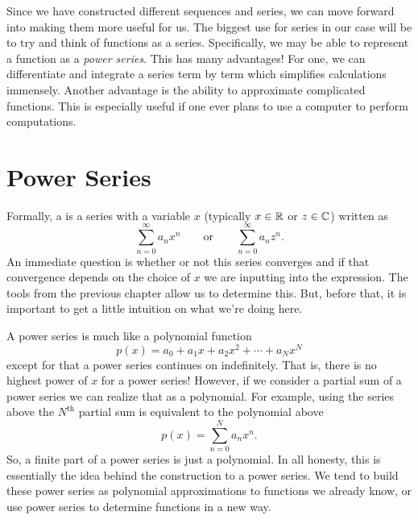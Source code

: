 Since we have constructed different sequences and series, we can move forward into making them more useful for us.  The biggest use for series in our case will be to try and think of functions as a series. Specifically, we may be able to represent a function as a \emph{power series}.  This has many advantages! For one, we can differentiate and integrate a series term by term which simplifies calculations immensely.  Another advantage is the ability to approximate complicated functions.  This is especially useful if one ever plans to use a computer to perform computations.

\section{Power Series}

Formally, a  is a series with a variable $x$ (typically $x\in \mathbb{R}$ or $z\in \mathbb{C}$) written as
\[
\sum_{n=0}^\infty a_n x^n \qquad \textrm{or} \qquad \sum_{n=0}^\infty a_n z^n.
\]
An immediate question is whether or not this series converges and if that convergence depends on the choice of $x$ we are inputting into the expression.  The tools from the previous chapter allow us to determine this.  But, before that, it is important to get a little intuition on what we're doing here.

A power series is much like a polynomial function
\[
p(x) = a_0 + a_1 x + a_2 x^2 + \cdots + a_N x^N
\]
except for that a power series continues on indefinitely. That is, there is no highest power of $x$ for a power series!  However, if we consider a partial sum of a power series we can realize that as a polynomial. For example, using the series above the $N^\textrm{th}$ partial sum is equivalent to the polynomial above
\[
p(x)=\sum_{n=0}^N a_n x^n.
\]
So, a finite part of a power series is just a polynomial.  In all honesty, this is essentially the idea behind the construction to a power series.  We tend to build these power series as polynomial approximations to functions we already know, or use power series to determine functions in a new way.

